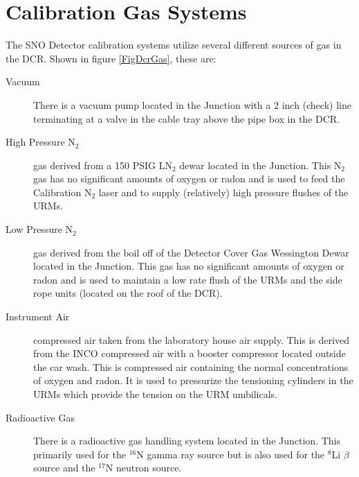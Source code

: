 




\chapter{Calibration Gas Systems}
  
  The SNO Detector calibration systems utilize several different
sources of gas in the DCR.  Shown in figure \ref{FigDcrGas},
these are:
\begin{description}

\item[Vacuum] There is a vacuum pump located in the Junction with
  a 2 inch (check) line terminating at a valve in the cable tray above
  the pipe box in the DCR.

\item[High Pressure N$_2$] gas derived from a 150 PSIG LN$_2$ dewar
  located in the Junction.  This N$_2$ gas has no significant amounts of
  oxygen or radon and is used to feed the Calibration N$_2$ laser
  and to supply (relatively) high pressure flushes of the 
  URMs.

\item[Low Pressure N$_2$] gas derived from the boil off of the
  Detector Cover Gas Wessington Dewar located in the Junction.  This
  gas has no significant amounts of oxygen or radon and is used
  to maintain a low rate flush of the URMs and the side rope units
  (located on the roof of the DCR).

\item[Instrument Air] compressed air taken from the laboratory 
  house air supply.  This is derived from the INCO compressed air
  with a booster compressor located outside the  car wash.  This 
  is compressed air containing the normal concentrations of oxygen
  and radon.  It is used to pressurize the tensioning cylinders in
  the URMs which provide the tension on the URM umbilicals.

\item[Radioactive Gas] There is a radioactive gas handling system
  located in the Junction.  This primarily used for the  $^{16}$N
  gamma ray source but is also used for the $^{8}$Li $\beta$
  source and the $^{17}$N neutron source.

\end{description}

